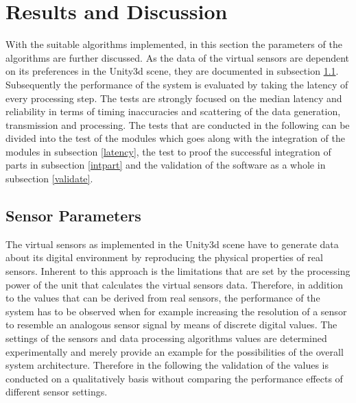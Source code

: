 \chapter{Results and Discussion} \label{Result}
 With the suitable algorithms implemented, in this section the parameters of the algorithms are further discussed. As the data of the virtual sensors are dependent on its preferences in the Unity3d scene, they are documented in subsection \ref{Parameters}. Subsequently the performance of the system is evaluated by taking the latency of every processing step. The tests are strongly focused on the median latency and reliability in terms of timing inaccuracies and scattering of the data generation, transmission and processing. The tests that are conducted in the following can be divided into the test of the modules which goes along with the integration of the modules in subsection \ref{latency}, the test to proof the successful integration of parts in subsection \ref{intpart} and the validation of the software as a whole in subsection \ref{validate}.
 
 \section{Sensor Parameters} \label{Parameters}
 The virtual sensors as implemented in the Unity3d scene have to generate data about its digital environment by reproducing the physical properties of real sensors. Inherent to this approach is the limitations that are set by the processing power of the unit that calculates the virtual sensors data. Therefore, in addition to the values that can be derived from real sensors, the performance of the system has to be observed when for example increasing the resolution of a sensor to resemble an analogous sensor signal by means of discrete digital values. The settings of the sensors and data processing algorithms values are determined experimentally and merely provide an example for the possibilities of the overall system architecture. Therefore in the following the validation of the values is conducted on a qualitatively basis without comparing the performance effects of different sensor settings. \\
 
